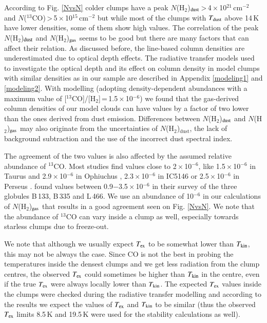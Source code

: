 \documentclass[printer]{aa}
\begin{document}
\label{disc:tempdens}

According to Fig. \ref{NvsN} colder clumps have a peak $N$(H$_2$)$_{\rm dust}$\,>\,4\,$\times$\,10$^{21}$\,cm$^{-2}$ and $N$($^{13}$CO)\,>\,5\,$\times$\,10$^{15}$\,cm$^{-2}$ but while most of the clumps with $T_{\rm dust}$ above 14\,K have lower densities, some of them show high values. The correlation of the peak $N$(H$_2$)$_{\rm dust}$ and $N$(H$_2$)$_{\rm gas}$ seems to be good but there are many factors that can affect their relation. As discussed before, the line-based column densities are underestimated due to optical depth effects. The radiative transfer models used to investigate the optical depth and its effect on column density in model clumps with similar densities as in our sample are described in Appendix \ref{modeling1} and \ref{modeling2}. With modelling (adopting density-dependent abundances with a maximum
value of [$^{13}$CO]/[H$_2$]\,=\,1.5\,$\times$\,10$^{-6}$) we found that the gas-derived column densities of our model clouds can have values by a factor of two lower than the ones derived from dust emission. Differences between $N$(H$_2$)$_{\rm dust}$ and $N$(H$_2$)$_{\rm gas}$ may also originate from the uncertainties of $N$(H$_2$)$\mathrm{_{dust}}$, the lack of background subtraction and the use of the incorrect dust spectral index.

The agreement of the two values is also affected by the assumed relative abundance of $^{13}$CO. Most studies find values close to 2\,$\times$\,10$^{-6}$, like 1.5\,$\times$\,10$^{-6}$ in Taurus and 2.9\,$\times$\,10$^{-6}$ in Ophiuchus \citep{frerking1982}, 2.3\,$\times$\,10$^{-6}$ in IC5146 \citep{lada1994} or 2.5\,$\times$\,10$^{-6}$ in Perseus \citep{pineda2008}. \citet{harjunpaa2004} found values between 0.9$-$3.5\,$\times$\,10$^{-6}$ in their survey of the three globules B\,133, B\,335 and L\,466. We use an abundance of 10$^{-6}$ in our calculations of $N$(H$_2$)$_{\rm gas}$ that results in a good agreement seen on Fig. \ref{NvsN}. 
We note that the abundance of $^{13}$CO can vary inside a clump as well, especially towards starless clumps due to freeze-out.

We note that although we usually expect $T_{\rm ex}$ to be somewhat lower than $T_{\rm kin}$, this may not be always the case. Since CO is not the best in probing the temperatures inside the densest clumps and we get less radiation from the clump centres, the observed $T_{\rm ex}$ could sometimes be higher than $T_{\rm kin}$ in the centre, even if the true $T_{\rm ex}$ were always locally lower than $T_{\rm kin}$. The expected $T_{\rm ex}$ values inside the clumps were checked during the radiative transfer modelling and according to the results we expect the values of $T_{\rm ex}$ and $T_{\rm kin}$ to be similar (thus the observed $T_{\rm ex}$ limits 8.5\,K and 19.5\,K were used for the stability calculations as well).
\end{document}
